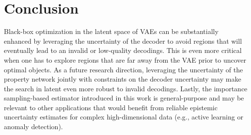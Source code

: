\section{Conclusion}

Black-box optimization in the latent space of VAEs can be substantially enhanced by leveraging the uncertainty of the decoder to avoid regions that will eventually lead to an invalid or low-quality decodings. This is even more critical when one has to explore regions that are far away from the VAE prior to uncover optimal objects. 
As a future research direction, leveraging the uncertainty of the property network jointly with constraints on the decoder uncertainty may make the search in latent even more robust to invalid decodings. 
Lastly, the importance sampling-based estimator introduced in this work is general-purpose and may be relevant to other applications that would benefit from reliable epistemic uncertainty estimates for complex high-dimensional data (e.g., active learning or anomaly detection).